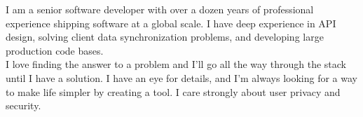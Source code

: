 

\begin{cvparagraph}

I am a senior software developer with over a dozen years of professional experience shipping software at a global scale. 
I have deep experience in API design, solving client data synchronization problems, and developing large production code bases. \\
I love finding the answer to a problem and I'll go all the way through the stack until I have a solution.
I have an eye for details, and I'm always looking for a way to make life simpler by creating a tool. 
I care strongly about user privacy and security.
\end{cvparagraph}
